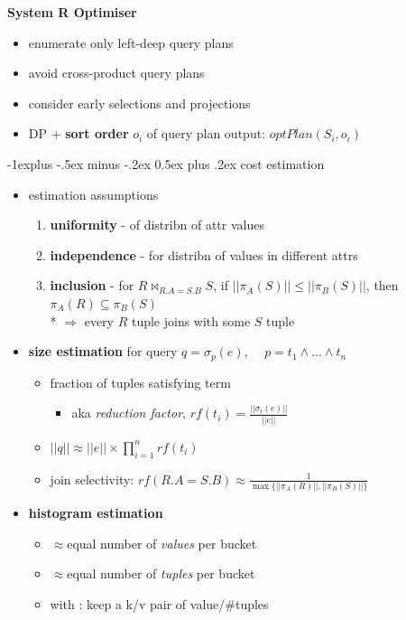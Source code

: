 \documentclass[10pt, landscape]{article}
\makeatletter
\renewcommand{\subsection}{\@startsection{subsection}{2}{0mm}%
  {-1explus -.5ex minus -.2ex}%
  {0.5ex plus .2ex}%
{\normalfont\normalsize\bfseries}}
\makeatother
\begin{document}
\begin{multicols*}{4}
  \textbf{System R Optimiser}

  \begin{itemize}
    \item enumerate only left-deep query plans
    \item avoid cross-product query plans 
    \item consider early selections and projections
    \item DP + \textbf{sort order} $o_i$ of query plan output: $optPlan(S_i, o_i)$
  \end{itemize}

  \subsection{cost estimation}

  \begin{itemize}
    \item estimation assumptions
      \begin{enumerate}
        \item \textbf{uniformity} - of distribn of attr values
        \item \textbf{independence} - for distribn of values in different attrs
        \item \textbf{inclusion} - for $R \bowtie_{R.A=S.B}S$, if $||\pi_A(S)|| \leq ||\pi_B(S)||$, then $\pi_A(R) \subseteq \pi_B(S)$ 
          \\* $\Rightarrow$ every $R$ tuple joins with some $S$ tuple
      \end{enumerate}
    \item \textbf{size estimation} for query $q = \sigma_p(e)$,  $\quad p = t_1 \land \dots \land t_n$
      \begin{itemize}
        \item {} fraction of tuples satisfying term
          \begin{itemize}
            \item aka \textit{reduction factor}, $rf(t_i) = \frac{||\sigma_t(e)||}{||e||}$
          \end{itemize}
        \item $||q|| \approx ||e|| \times \prod^n_{i=1}rf(t_i)$
        \item join selectivity: $rf(R.A=S.B) \approx \frac{1}{\max\{||\pi_A(R)||, ||\pi_B(S)||\}}$
      \end{itemize}
    \item \textbf{histogram estimation}
      \begin{itemize}
        \item {} $\approx$equal number of \textit{values} per bucket
        \item {} $\approx$equal number of \textit{tuples} per bucket
        \item with : keep a k/v pair of value/\#tuples
      \end{itemize}
  \end{itemize}


\end{multicols*}
\end{document}

